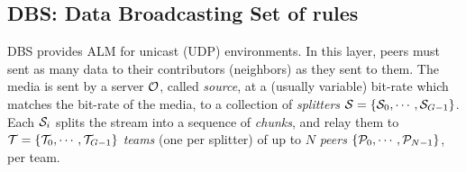 \subsection{DBS: Data Broadcasting Set of rules}
\label{sec:DBL}
DBS provides ALM for unicast (UDP) environments. {\color{red} In this
  layer, peers must sent as many data to their contributors
  (neighbors) as they sent to them.} The media is sent by a server
${\cal O}$, called \emph{source}, at a (usually variable) bit-rate
which matches the bit-rate of the media, to a collection of
\emph{splitters} ${\cal S}=\{{\cal S}_0, \cdots, {\cal
  S}_{G-1}\}$. Each ${\cal S}_i$ splits the stream into a sequence of
\emph{chunks}, and relay them to ${\cal T}=\{{\cal T}_0,\cdots,{\cal
  T}_{G-1}\}$ \emph{teams} (one per splitter) of up to $N$
\emph{peers} $\{{\cal P}_0,\cdots,{\cal P}_{N-1}\}$, per team.

